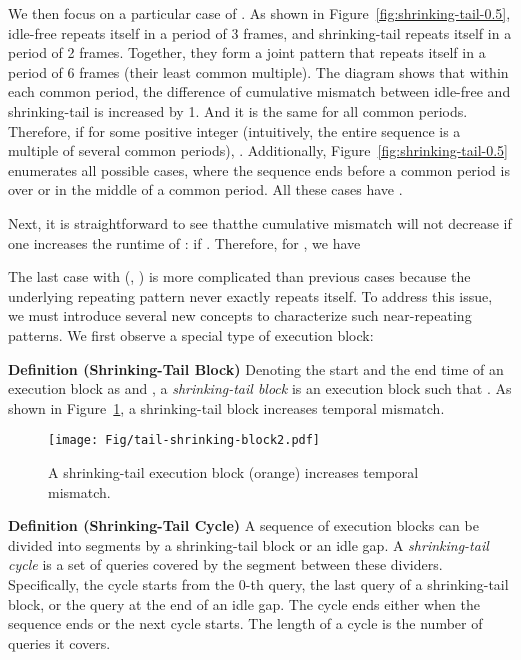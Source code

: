 We then focus on a particular case of . As shown in Figure~\ref{fig:shrinking-tail-0.5}, idle-free repeats itself in a period of 3 frames, and shrinking-tail repeats itself in a period of 2 frames. Together, they form a joint pattern that repeats itself in a period of 6 frames (their least common multiple). The diagram shows that within each common period, the difference of cumulative mismatch between idle-free and shrinking-tail is increased by 1. And it is the same for all common periods. Therefore, if  for some positive integer  (intuitively, the entire sequence is a multiple of several common periods), . Additionally, Figure~\ref{fig:shrinking-tail-0.5} enumerates all possible cases, where the sequence ends before a common period is over or in the middle of a common period. All these cases have . 

Next, it is straightforward to see thatthe cumulative mismatch will not decrease if one increases the runtime  of :  if . 
Therefore, for , we have





The last case with  (\ie, ) is more complicated than previous cases because the underlying repeating pattern never exactly repeats itself. To address this issue, we must introduce several new concepts to characterize such near-repeating patterns. We first observe a special type of execution block:

{\noindent \bf  Definition (Shrinking-Tail Block)} Denoting the start and the end time of an execution block as  and , a {\em shrinking-tail block} is an execution block such that . As shown in Figure~\ref{fig:shrinking-tail-block}, a shrinking-tail block increases temporal mismatch.

\begin{figure}[]
\centering
\texttt{[image: Fig/tail-shrinking-block2.pdf]}

\caption{A shrinking-tail execution block (orange) increases temporal mismatch.
}
\label{fig:shrinking-tail-block}
\end{figure}


{\noindent \bf  Definition (Shrinking-Tail Cycle)} A sequence of execution blocks can be divided into segments by a shrinking-tail block or an idle gap. A {\em shrinking-tail cycle} is a set of queries covered by the segment between these dividers. Specifically, the cycle starts from the 0-th query, the last query of a shrinking-tail block, or the query at the end of an idle gap. The cycle ends either when the sequence ends or the next cycle starts. The length of a cycle is the number of queries it covers. 


